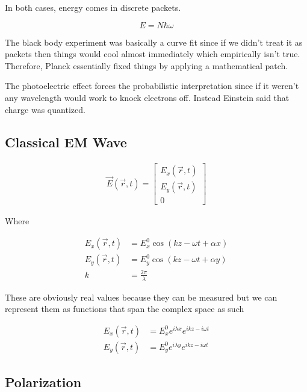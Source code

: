 In both cases, energy comes in discrete packets.

\begin{equation}
  E = N\hbar\omega \label{eq:energyQ}
\end{equation}

The black body experiment was basically a curve fit since if we didn't treat it as packets then things would cool almost immediately which empirically isn't true. Therefore, Planck essentially fixed things by applying a mathematical patch.

The photoelectric effect forces the probabilistic interpretation since if it weren't any wavelength would work to knock electrons off. Instead Einstein said that charge was quantized.

\subsection{Classical EM Wave}

\begin{align}
  \vec{E}(\vec{r}, t) = \begin{bmatrix}
                          E_x(\vec{r}, t) \\
                          E_y(\vec{r}, t) \\
                          0
                        \end{bmatrix}
\end{align}

Where

\begin{align}
  E_x(\vec{r}, t) &= E_{x}^{0}\cos{(kz - \omega t + \alpha x)} \\
  E_y(\vec{r}, t) &= E_{y}^{0}\cos{(kz - \omega t + \alpha y)}  \\
  k &= \frac{2 \pi}{\lambda}
\end{align}

These are obviously real values because they can be measured but we can represent them as functions that span the complex space as such

\begin{align}
  E_x(\vec{r}, t) &= E_{x}^{0}e^{i \lambda x}e^{ikz - i \omega t} \\
  E_y(\vec{r}, t) &= E_{y}^{0}e^{i \lambda y}e^{ikz - i \omega t}
\end{align}

\subsection{Polarization}

